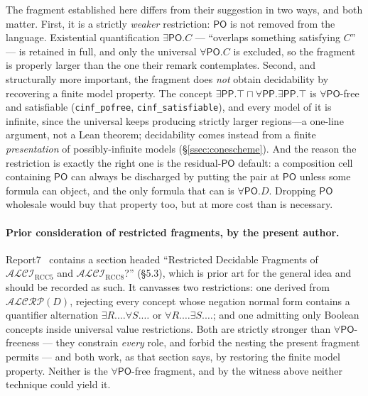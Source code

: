 \documentclass[11pt]{article}
\newcommand{\ALCIRCC}[1]{\mathcal{ALCI}_{\mathrm{RCC#1}}}
\newcommand{\PO}{\mathsf{PO}}
\newcommand{\PP}{\mathsf{PP}}
\newcommand{\code}[1]{\texttt{#1}}
\theoremstyle{plain}
\theoremstyle{definition}
\begin{document}
The fragment established here differs from their suggestion in two ways, and
both matter. First, it is a strictly \emph{weaker} restriction: $\PO$ is not
removed from the language. Existential quantification $\exists\PO.C$ ---
``overlaps something satisfying $C$'' --- is retained in full, and only the
universal $\forall\PO.C$ is excluded, so the fragment is properly larger than
the one their remark contemplates. Second, and structurally more important,
the fragment does \emph{not} obtain decidability by recovering a finite model
property. The concept $\exists\PP.\top \sqcap \forall\PP.\exists\PP.\top$ is
$\forall\PO$-free and satisfiable (\code{cinf\_pofree},
\code{cinf\_satisfiable}), and every model of it is infinite, since the universal
keeps producing strictly larger regions---a one-line argument, not a Lean
theorem; decidability
comes instead from a finite \emph{presentation} of possibly-infinite models
(\S\ref{ssec:conescheme}). And the reason the restriction is exactly the
right one is the residual-$\PO$ default: a composition cell containing $\PO$
can always be discharged by putting the pair at $\PO$ unless some formula can
object, and the only formula that can is $\forall\PO.D$. Dropping $\PO$
wholesale would buy that property too, but at more cost than is necessary.

\paragraph{Prior consideration of restricted fragments, by the present
author.} Report7~\cite{Wessel2003} contains a section headed ``Restricted
Decidable Fragments of $\ALCIRCC{5}$ and $\ALCIRCC{8}$?'' (\S5.3), which is
prior art for the general idea and should be recorded as such. It canvasses
two restrictions: one derived from $\mathcal{ALCRP}(D)$, rejecting every
concept whose negation normal form contains a quantifier alternation
$\exists R.\ldots\forall S.\ldots$ or $\forall R.\ldots\exists S.\ldots$; and
one admitting only Boolean concepts inside universal value restrictions.
Both are strictly stronger than $\forall\PO$-freeness --- they constrain
\emph{every} role, and forbid the nesting the present fragment permits ---
and both work, as that section says, by restoring the finite model property.
Neither is the $\forall\PO$-free fragment, and by the witness above neither
technique could yield it.
\end{document}
